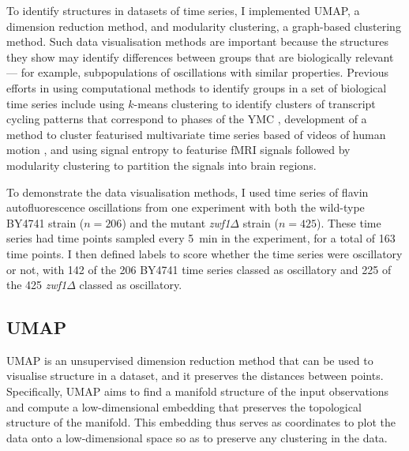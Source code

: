 To identify structures in datasets of time series, I implemented UMAP, a dimension reduction method, and modularity clustering, a graph-based clustering method.
Such data visualisation methods are important because the structures they show may identify differences between groups that are biologically relevant --- for example, subpopulations of oscillations with similar properties.
Previous efforts in using computational methods to identify groups in a set of biological time series include using $k$-means clustering to identify clusters of transcript cycling patterns that correspond to phases of the YMC \parencite{tuLogicYeastMetabolic2005}, development of a method to cluster featurised multivariate time series based of videos of human motion \parencite{wangStructureBasedStatisticalFeatures2007}, and using signal entropy to featurise fMRI signals followed by modularity clustering to partition the signals into brain regions.

To demonstrate the data visualisation methods, I used time series of flavin autofluorescence oscillations from one experiment with both the wild-type BY4741 strain ($n=206$) and the mutant \textit{zwf1$\Delta$} strain ($n=425$).
These time series had time points sampled every \SI{5}{\minute} in the experiment, for a total of 163 time points.
I then defined labels to score whether the time series were oscillatory or not, with 142 of the 206 BY4741 time series classed as oscillatory and 225 of the 425 \textit{zwf1$\Delta$} classed as oscillatory.


\subsection{UMAP}
\label{subsec:analysis-clustering-umap}

UMAP \parencite{mcinnesUMAPUniformManifold2020} is an unsupervised dimension reduction method that can be used to visualise structure in a dataset, and it preserves the distances between points.
Specifically, UMAP aims to find a manifold structure of the input observations and compute a low-dimensional embedding that preserves the topological structure of the manifold.
This embedding thus serves as coordinates to plot the data onto a low-dimensional space so as to preserve any clustering in the data.

